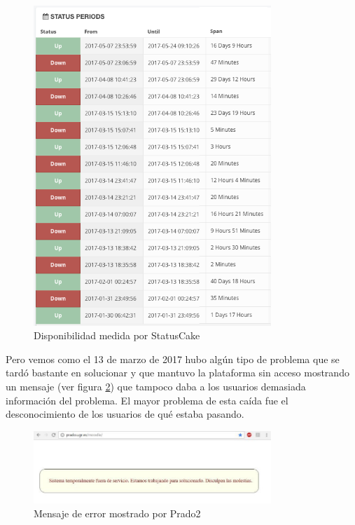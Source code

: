 \begin{figure}[h!]
\centering
\includegraphics[width=0.8\textwidth]{../screenshots/statuscake1}
\caption{Disponibilidad medida por StatusCake}
\label{fig:statuscake1}
\end{figure}

\bigskip
Pero vemos como el 13 de marzo de 2017 hubo algún tipo de problema que se tardó bastante en solucionar y que mantuvo la plataforma sin acceso mostrando un mensaje (ver figura \ref{fig:pradocaido}) que tampoco daba a los usuarios demasiada información del problema. El mayor problema de esta caída fue el desconocimiento de los usuarios de qué estaba pasando.

\begin{figure}[h!]
\centering
\includegraphics[width=0.8\textwidth]{../images/pradocaido}
\caption{Mensaje de error mostrado por Prado2}
\label{fig:pradocaido}
\end{figure}

